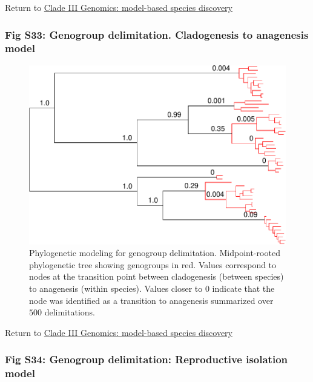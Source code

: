 \documentclass[
  11pt,
]{article}
\begin{document}
Return to \protect\hyperlink{model-based-species-discovery-5}{Clade III Genomics: model-based species discovery}
\pagebreak

\hypertarget{fig-s33-genogroup-delimitation.-cladogenesis-to-anagenesis-model}{%
\subsubsection{Fig S33: Genogroup delimitation. Cladogenesis to anagenesis model}\label{fig-s33-genogroup-delimitation.-cladogenesis-to-anagenesis-model}}

\begin{figure}
\includegraphics[height=.6\textwidth,]{Supplementary_Material_files/figure-latex/cladeIIImolecularDelimitationsPhylogeny2-1} \caption{Phylogenetic modeling for genogroup delimitation. Midpoint-rooted phylogenetic tree showing genogroups in red. Values correspond to nodes at the transition point between cladogenesis (between species) to anagenesis (within species). Values closer to 0 indicate that the node was identified as a transition to anagenesis summarized over $500$ delimitations.}\label{fig:cladeIIImolecularDelimitationsPhylogeny2}
\end{figure}

Return to \protect\hyperlink{model-based-species-discovery-5}{Clade III Genomics: model-based species discovery}
\pagebreak

\hypertarget{fig-s34-genogroup-delimitation-reproductive-isolation-model}{%
\subsubsection{Fig S34: Genogroup delimitation: Reproductive isolation model}\label{fig-s34-genogroup-delimitation-reproductive-isolation-model}}
\end{document}
